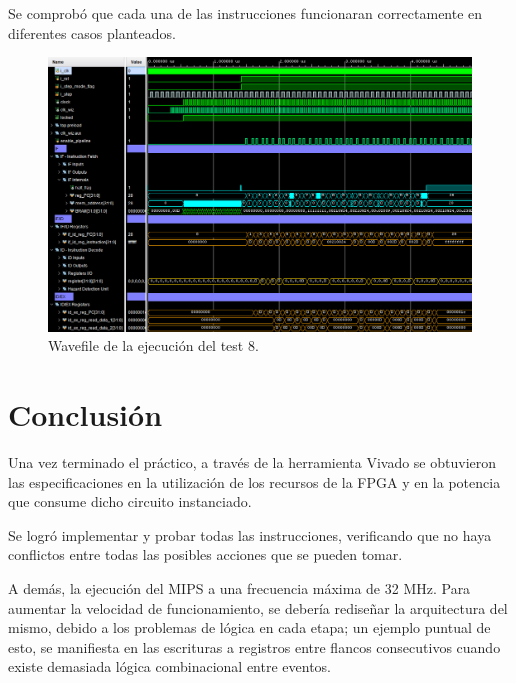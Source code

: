 \documentclass[12pt,A4paper,titlepage]{article}
\begin{document}
Se comprobó que cada una de las instrucciones funcionaran correctamente en diferentes casos planteados.

\begin{figure} [H]
    \centering
    \includegraphics[width=\textwidth]{figure/testbench-wave.png}
    \caption{Wavefile de la ejecución del test 8.}
    \label{fig:test-bench}
\end{figure}

\newpage
\section{Conclusión}
Una vez terminado el práctico, a través de la herramienta Vivado se
obtuvieron las especificaciones en la utilización de los recursos de la FPGA y en la potencia que consume dicho circuito instanciado.

Se logró implementar y probar todas las instrucciones, verificando que no haya conflictos entre todas las posibles acciones que se pueden tomar. 

A demás, la ejecución del MIPS a una frecuencia máxima de 32 MHz. Para aumentar la velocidad de funcionamiento, se debería rediseñar la arquitectura del mismo, debido a los problemas de lógica en cada etapa; un ejemplo puntual de esto, se manifiesta en las escrituras a registros entre flancos consecutivos cuando existe demasiada lógica combinacional entre eventos.
\end{document}
